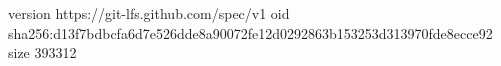 version https://git-lfs.github.com/spec/v1
oid sha256:d13f7bdbcfa6d7e526dde8a90072fe12d0292863b153253d313970fde8ecce92
size 393312
